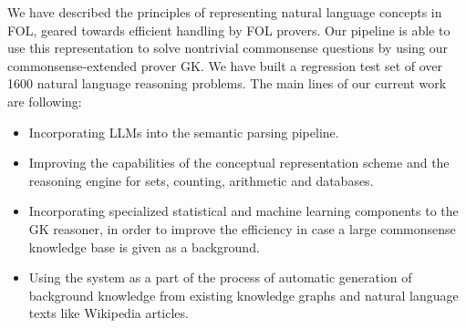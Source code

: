 \documentclass[runningheads]{llncs}
\begin{document}
We have described the principles of representing natural language concepts in FOL, geared towards
efficient handling by FOL provers. Our pipeline is able to use this representation to solve 
nontrivial commonsense questions by using our commonsense-extended prover GK. 
We have built a regression test set of over 1600 natural language reasoning problems.
The main lines of our current work are following:
\begin{itemize}
\item Incorporating LLMs into the semantic parsing pipeline. 
\item Improving the capabilities of the conceptual representation scheme and the reasoning engine for sets, counting, arithmetic and databases.
\item Incorporating specialized statistical and machine learning components to the GK reasoner, in order to improve the efficiency in case a large commonsense knowledge base is given as a background. 
\item Using the system as a part of the process of automatic generation of background knowledge from existing knowledge graphs and 
natural language texts like Wikipedia
articles.
\end{itemize}






\end{document}
